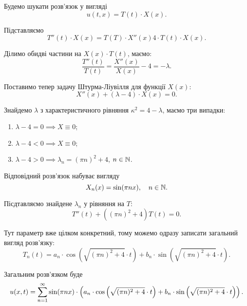 \begin{solution}
	Будемо шукати розв'язок у вигляді
	\begin{equation*}
		u(t, x) = T(t) \cdot X(x).
	\end{equation*}

	Підставляємо
	\begin{equation*}
		T''(t) \cdot X(x) = T(T) \cdot X''(x)  4 \cdot T(t) \cdot X(x).
	\end{equation*}
	
	Ділимо обидві частини на $X(x) \cdot T(t)$, маємо:
	\begin{equation*}
		\frac{T''(t)}{T(t)} = \frac{X''(x)}{X(x)} - 4 = - \lambda.
	\end{equation*}
	
	Поставимо тепер задачу Штурма-Ліувілля для функції $X(x)$:
	\begin{equation*}
		X''(x) + (\lambda - 4) \cdot X(x) = 0.
	\end{equation*}

	Знайдемо $\lambda$ з характеристичного рівняння $\kappa^2 = 4 - \lambda$, маємо три випадки:
	\begin{enumerate}
		\item $\lambda - 4 = 0 \implies X \equiv 0$;
		\item $\lambda - 4 < 0 \implies X \equiv 0$;
		\item $\lambda - 4 > 0 \implies \lambda_n = (\pi n)^2 + 4$, $n \in \mathbb{N}$.
	\end{enumerate}

	Відповідний розв'язок набуває вигляду
	\begin{equation*}
		X_n(x) = \sin (\pi n x), \quad n \in \mathbb{N}.
	\end{equation*}

	Пісдтавляємо знайдене $\lambda_n$ у рівняння на $T$:
	\begin{equation*}
		T''(t) + ((\pi n)^2 + 4) T(t) = 0.
	\end{equation*}

	Тут параметр вже цілком конкретний, тому можемо одразу записати загальний вигляд розв'язку:
	\begin{equation*}
		T_n(t) = a_n \cdot \cos \left( \sqrt{(\pi n)^2 + 4} \cdot t \right) + b_n \cdot \sin \left( \sqrt{(\pi n)^2 + 4} \cdot t \right).
	\end{equation*}

	Загальним розв'язком буде
	\begin{equation*}
		u(x, t) = \displaystyle\sum\limits_{n = 1}^\infty \sin(\pi n x) \cdot \left( a_n \cdot \cos \left( \sqrt{(\pi n)^2 + 4} \cdot t \right) + b_n \cdot \sin \left( \sqrt{(\pi n)^2 + 4} \cdot t \right) \right).
	\end{equation*}


\end{solution}
